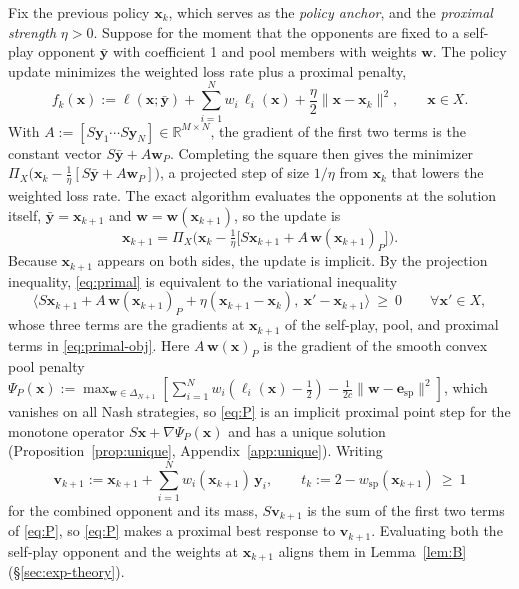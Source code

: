 \documentclass{article} %
\theoremstyle{plain}
\theoremstyle{remark}
\newcommand{\Proj}{\Pi}
\newcommand{\simplex}{\Delta}
\newcommand{\bx}{{\bm{x}}}
\newcommand{\by}{{\bm{y}}}
\newcommand{\bv}{{\bm{v}}}
\newcommand{\bw}{{\bm{w}}}
\newcommand{\be}{{\bm{e}}}
\newcommand{\esp}{\be_{\mathrm{sp}}}
\newcommand{\wsp}{w_{\mathrm{sp}}}
\begin{document}
Fix the previous policy $\bx_k$, which serves as the \emph{policy anchor}, and the \emph{proximal strength} $\eta>0$. Suppose for the moment that the opponents are fixed to a self-play opponent $\bar{\by}$ with coefficient 1 and pool members with weights $\bw$. The policy update minimizes the weighted loss rate plus a proximal penalty,
\begin{equation}
f_k(\bx):=\ell(\bx;\bar{\by})+\sum_{i=1}^Nw_i\,\ell_i(\bx)+\frac\eta2\|\bx-\bx_k\|^2,\qquad \bx\in X .
\label{eq:primal-obj}
\end{equation}
With $A:=[S\by_1\cdots S\by_N]\in\mathbb R^{M\times N}$, the gradient of the first two terms is the constant vector $S\bar{\by}+A\bw_P$. Completing the square then gives the minimizer $\Proj_X\big(\bx_k-\tfrac1\eta[S\bar{\by}+A\bw_P]\big)$, a projected step of size $1/\eta$ from $\bx_k$ that lowers the weighted loss rate. The exact algorithm evaluates the opponents at the solution itself, $\bar{\by}=\bx_{k+1}$ and $\bw=\bw(\bx_{k+1})$, so the update is
\begin{equation}
\bx_{k+1}=\Proj_X\Big(\bx_k-\tfrac1\eta\big[S\bx_{k+1}+A\,\bw(\bx_{k+1})_P\big]\Big).
\label{eq:primal}
\end{equation}
Because $\bx_{k+1}$ appears on both sides, the update is implicit. By the projection inequality, \eqref{eq:primal} is equivalent to the variational inequality
\begin{equation}
\big\langle S\bx_{k+1}+A\,\bw(\bx_{k+1})_P+\eta(\bx_{k+1}-\bx_k),\ \bx'-\bx_{k+1}\big\rangle\ \ge\ 0\qquad\forall \bx'\in X ,
\label{eq:P}
\end{equation}
whose three terms are the gradients at $\bx_{k+1}$ of the self-play, pool, and proximal terms in \eqref{eq:primal-obj}. Here $A\,\bw(\bx)_P$ is the gradient of the smooth convex pool penalty $\Psi_P(\bx):=\max_{\bw\in\simplex_{N+1}}[\sum_{i=1}^Nw_i(\ell_i(\bx)-\tfrac12)-\tfrac1{2c}\|\bw-\esp\|^2]$, which vanishes on all Nash strategies, so \eqref{eq:P} is an implicit proximal point step for the monotone operator $S\bx+\nabla\Psi_P(\bx)$ and has a unique solution (Proposition~\ref{prop:unique}, Appendix~\ref{app:unique}). Writing
\[
\bv_{k+1}:=\bx_{k+1}+\sum_{i=1}^Nw_i(\bx_{k+1})\,\by_i,\qquad t_k:=2-\wsp(\bx_{k+1})\ \ge\ 1
\]
for the combined opponent and its mass, $S\bv_{k+1}$ is the sum of the first two terms of \eqref{eq:P}, so \eqref{eq:P} makes a proximal best response to $\bv_{k+1}$. Evaluating both the self-play opponent and the weights at $\bx_{k+1}$ aligns them in Lemma~\ref{lem:B} (\S\ref{sec:exp-theory}).
\end{document}
